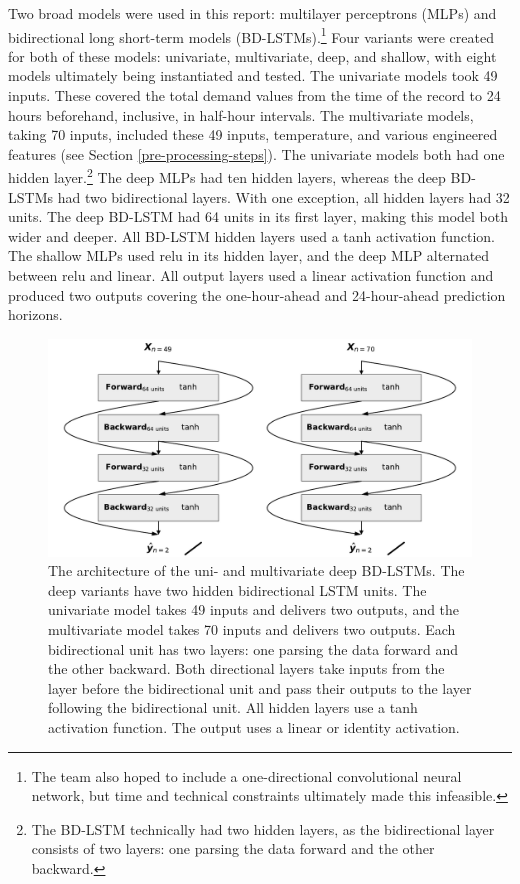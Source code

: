 \documentclass[mstat,12pt]{unswthesis}
\begin{document}
Two broad models were used in this report: multilayer perceptrons (MLPs) and bidirectional long short-term models (BD-LSTMs).\footnote{The team also hoped to include a one-directional convolutional neural network, but time and technical constraints ultimately made this infeasible.} Four variants were created for both of these models: univariate, multivariate, deep, and shallow, with eight models ultimately being instantiated and tested. The univariate models took 49 inputs. These covered the total demand values from the time of the record to 24 hours beforehand, inclusive, in half-hour intervals. The multivariate models, taking 70 inputs, included these 49 inputs, temperature, and various engineered features (see Section \ref{pre-processing-steps}). The univariate models both had one hidden layer.\footnote{The BD-LSTM technically had two hidden layers, as the bidirectional layer consists of two layers: one parsing the data forward and the other backward.} The deep MLPs had ten hidden layers, whereas the deep BD-LSTMs had two bidirectional layers. With one exception, all hidden layers had 32 units. The deep BD-LSTM had 64 units in its first layer, making this model both wider and deeper. All BD-LSTM hidden layers used a tanh activation function. The shallow MLPs used relu in its hidden layer, and the deep MLP alternated between relu and linear. All output layers used a linear activation function and produced two outputs covering the one-hour-ahead and 24-hour-ahead prediction horizons.

\begin{figure}[H]
\centerline{\includegraphics[width=\columnwidth]{Figures/Diagrams/BD-LSTM deep.pdf}}
\caption{The architecture of the uni- and multivariate deep BD-LSTMs. The deep variants have two hidden bidirectional LSTM units. The univariate model takes 49 inputs and delivers two outputs, and the multivariate model takes 70 inputs and delivers two outputs. Each bidirectional unit has two layers: one parsing the data forward and the other backward. Both directional layers take inputs from the layer before the bidirectional unit and pass their outputs to the layer following the bidirectional unit. All hidden layers use a tanh activation function. The output uses a linear or identity activation.}
\label{lstm_deep}
\end{figure}
\end{document}
